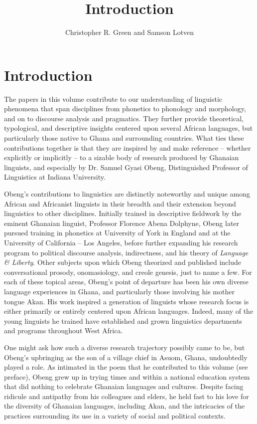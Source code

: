 \documentclass[output=paper,colorlinks,citecolor=brown]{langscibook}
\title{Introduction}
\author{Christopher R. Green\affiliation{Syracuse University} and Samson Lotven \affiliation{Indiana University}}
\begin{document}
\maketitle

\section{Introduction}
The papers in this volume contribute to our understanding of linguistic phenomena that span disciplines from phonetics to phonology and morphology, and on to discourse analysis and pragmatics. They further provide theoretical, typological, and descriptive insights centered upon several African languages, but particularly those native to Ghana and surrounding countries. What ties these contributions together is that they are inspired by and make reference -- whether explicitly or implicitly -- to a sizable body of research produced by Ghanaian linguists, and especially by Dr. Samuel Gyasi Obeng, Distinguished Professor of Linguistics at Indiana University. 

\begin{sloppypar}
Obeng's contributions to linguistics are distinctly noteworthy and unique among African and Africanist linguists in their breadth and their extension beyond linguistics to other disciplines. Initially trained in descriptive fieldwork by the eminent Ghanaian linguist, Professor Florence Abena Dolphyne, Obeng later pursued training in phonetics at University of York in England and at the University of California -- Los Angeles, before further expanding his research program to political discourse analysis, indirectness, and his theory of \textit{Language \& Liberty}. Other subjects upon which Obeng theorized and published include conversational prosody, onomasiology, and creole genesis, just to name a few. For each of these topical areas, Obeng’s point of departure has been his own diverse language experiences in Ghana, and particularly those involving his mother tongue Akan. His work inspired a generation of linguists whose research focus is either primarily or entirely centered upon African languages. Indeed, many of the young linguists he trained have established and grown linguistics departments and programs throughout West Africa. 
\end{sloppypar}

One might ask how such a diverse research trajectory possibly came to be, but Obeng's upbringing as the son of a village chief in Asuom, Ghana, undoubtedly played a role. As intimated in the poem that he contributed to this volume (see preface), Obeng grew up in trying times and within a national education system that did nothing to celebrate Ghanaian languages and cultures. Despite facing ridicule and antipathy from his colleagues and elders, he held fast to his love for the diversity of Ghanaian languages, including Akan, and the intricacies of the practices surrounding its use in a variety of social and political contexts.
\end{document}
